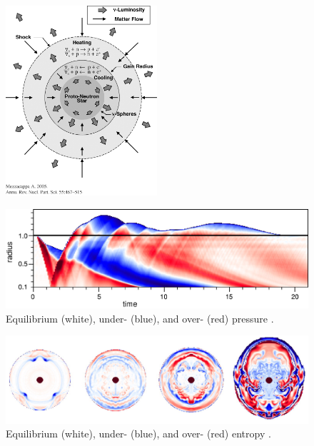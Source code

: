 \documentclass{beamer}
\begin{document}
\begin{frame}

  \begin{figure}[htb!]
    \centering
    \includegraphics[width=0.5\textwidth]{pns.jpeg}
  \end{figure}

\end{frame}

\begin{frame}

  \begin{figure}[htb!]
    \centering
    \includegraphics[width=\textwidth]{pressure.jpg}
    \caption{Equilibrium (white), under- (blue), and over- (red) pressure
             \citep{bmd2003}.}
  \end{figure}

\end{frame}

\begin{frame}

  \begin{figure}[htb!]
    \centering
    \includegraphics[width=\textwidth]{sasi.jpg}
    \caption{Equilibrium (white), under- (blue), and over- (red) entropy
             \citep{bmd2003}.}
  \end{figure}

\end{frame}
\end{document}
